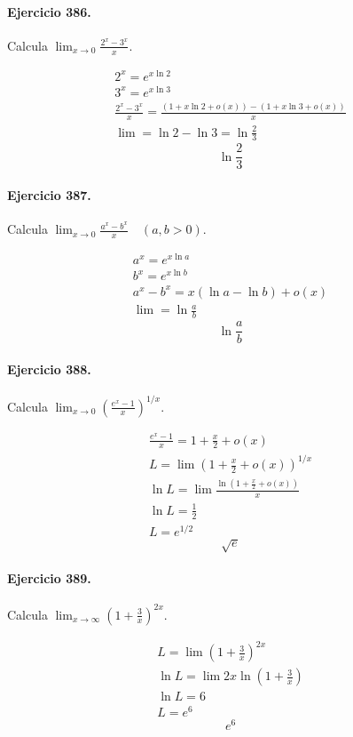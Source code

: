 \documentclass[11pt,a4paper]{article}
\begin{document}
\paragraph{Ejercicio 386.} Calcula $\displaystyle \lim_{x\to0}\frac{2^x-3^x}{x}$.

\[
\begin{aligned}
2^x=e^{x\ln2}\\
3^x=e^{x\ln3}\\
\frac{2^x-3^x}{x}=\frac{(1+x\ln2+o(x))-(1+x\ln3+o(x))}{x}\\
\lim=\ln2-\ln3=\ln\frac23
\end{aligned}
\]
\[\boxed{\ln\frac23}\]


\paragraph{Ejercicio 387.} Calcula $\displaystyle \lim_{x\to0}\frac{a^x-b^x}{x}\quad(a,b>0)$.

\[
\begin{aligned}
a^x=e^{x\ln a}\\
b^x=e^{x\ln b}\\
a^x-b^x=x(\ln a-\ln b)+o(x)\\
\lim=\ln\frac{a}{b}
\end{aligned}
\]
\[\boxed{\ln\frac{a}{b}}\]


\paragraph{Ejercicio 388.} Calcula $\displaystyle \lim_{x\to0}\left(\frac{e^x-1}{x}\right)^{1/x}$.

\[
\begin{aligned}
\frac{e^x-1}{x}=1+\frac{x}{2}+o(x)\\
L=\lim\left(1+\frac{x}{2}+o(x)\right)^{1/x}\\
\ln L=\lim\frac{\ln(1+\frac{x}{2}+o(x))}{x}\\
\ln L=\frac12\\
L=e^{1/2}
\end{aligned}
\]
\[\boxed{\sqrt e}\]


\paragraph{Ejercicio 389.} Calcula $\displaystyle \lim_{x\to\infty}\left(1+\frac{3}{x}\right)^{2x}$.

\[
\begin{aligned}
L=\lim\left(1+\frac{3}{x}\right)^{2x}\\
\ln L=\lim 2x\ln\left(1+\frac{3}{x}\right)\\
\ln L=6\\
L=e^6
\end{aligned}
\]
\[\boxed{e^6}\]
\end{document}
